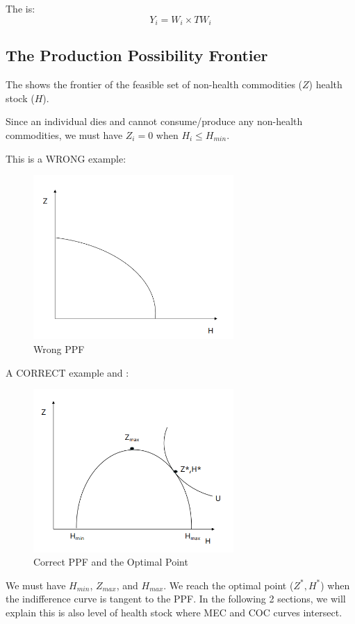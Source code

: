         The  is:
        \begin{equation*}
            Y_i = W_i\times TW_i
        \end{equation*}
           
    \subsection{The Production Possibility Frontier}

        The  shows the frontier of the feasible set of non-health commodities ($Z$) health stock ($H$).

        Since an individual dies and cannot consume/produce any non-health commodities, we must have $Z_i=0$ when $H_i \leq H_{min}$.

        This is a WRONG example:
        \begin{figure}[H]
            \centering
            \includegraphics[width=3in]{images/ch3/23.png}
            \caption{Wrong PPF}
        \end{figure}
        A CORRECT example and :
        \begin{figure}[H]
            \centering
            \includegraphics[width=3in]{images/ch3/24.png}
            \caption{Correct PPF and the Optimal Point}
        \end{figure}
        We must have $H_{min}$, $Z_{max}$, and $H_{max}$.  We reach the optimal point ($Z^*,H^*$) when the indifference curve is tangent to the PPF. In the following 2 sections, we will explain this is also level of health stock where MEC and COC curves intersect.

